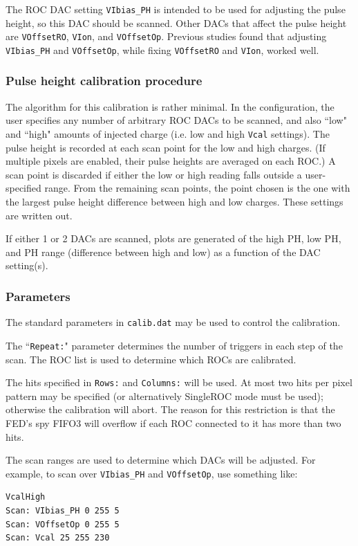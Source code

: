 The ROC DAC setting \verb|VIbias_PH| is intended to be used for adjusting the pulse height, so this DAC should be scanned.  Other DACs that affect the pulse height are \verb|VOffsetRO|, \verb|VIon|, and \verb|VOffsetOp|.  Previous studies found that adjusting \verb|VIbias_PH| and \verb|VOffsetOp|, while fixing \verb|VOffsetRO| and \verb|VIon|, worked well.~\cite{bib:Gromova}

\subsubsection{Pulse height calibration procedure}

The algorithm for this calibration is rather minimal.  In the configuration, the user specifies any number of arbitrary ROC DACs to be scanned, and also ``low" and ``high" amounts of injected charge (i.e. low and high \verb|Vcal| settings).  The pulse height is recorded at each scan point for the low and high charges.  (If multiple pixels are enabled, their pulse heights are averaged on each ROC.)  A scan point is discarded if either the low or high reading falls outside a user-specified range.  From the remaining scan points, the point chosen is the one with the largest pulse height difference between high and low charges.  These settings are written out.

If either 1 or 2 DACs are scanned, plots are generated of the high PH, low PH, and PH range (difference between high and low) as a function of the DAC setting(s).

\subsubsection{Parameters}

The standard parameters in \verb|calib.dat| may be used to control the calibration.

The ``\verb|Repeat:|" parameter determines the number of triggers in each step of the scan.  The ROC list is used to determine which ROCs are calibrated.

The hits specified in \verb|Rows:| and \verb|Columns:| will be used.  At most two hits per pixel pattern may be specified (or alternatively SingleROC mode must be used); otherwise the calibration will abort.  The reason for this restriction is that the FED's spy FIFO3 will overflow if each ROC connected to it has more than two hits.

The scan ranges are used to determine which DACs will be adjusted.  For example, to scan over \verb|VIbias_PH| and \verb|VOffsetOp|, use something like:
\begin{verbatim}
VcalHigh
Scan: VIbias_PH 0 255 5
Scan: VOffsetOp 0 255 5
Scan: Vcal 25 255 230
\end{verbatim}


